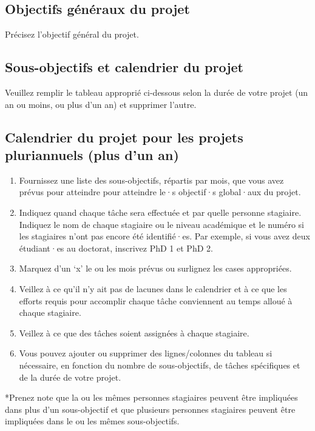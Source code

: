 \documentclass{mitacs-acceleration}
\begin{document}

\subsection{Objectifs généraux du projet} %

\begin{instructions}
Précisez l'objectif général du projet.
\end{instructions}


\subsection{Sous-objectifs et calendrier du projet} %

\begin{instructions}
Veuillez remplir le tableau approprié ci-dessous selon la durée de votre projet (un an ou moins, ou plus d'un an) et supprimer l'autre.
\end{instructions}

\tolandscape
\subsection*{Calendrier du projet pour les projets pluriannuels (plus d'un an)}

\begin{instructions}
\begin{enumerate}
\item  Fournissez une liste des sous-objectifs, répartis par mois, que vous avez prévus pour atteindre pour atteindre le·s objectif·s global·aux du projet.
\item  Indiquez quand chaque tâche sera effectuée et par quelle personne stagiaire. Indiquez le nom de chaque stagiaire ou le niveau académique et le numéro si les stagiaires n'ont pas encore été identifié·es. Par exemple, si vous avez deux étudiant·es au doctorat, inscrivez \og{}PhD 1\fg{} et \og{}PhD 2\fg{}. 
\item  Marquez d'un ‘x' le ou les mois prévus ou surlignez les cases appropriées. 
\item  Veillez à ce qu'il n'y ait pas de lacunes dans le calendrier et à ce que les efforts requis pour accomplir chaque tâche conviennent au temps alloué à chaque stagiaire.
\item  Veillez à ce que des tâches soient assignées à chaque stagiaire.
\item  Vous pouvez ajouter ou supprimer des lignes/colonnes du tableau si nécessaire, en fonction du nombre de sous-objectifs, de tâches spécifiques et de la durée de votre projet.
\end{enumerate}
*Prenez note que la ou les mêmes personnes stagiaires peuvent être impliquées dans plus d'un sous-objectif et que plusieurs personnes stagiaires peuvent être impliquées dans le ou les mêmes sous-objectifs.
\end{instructions}
\end{document}
